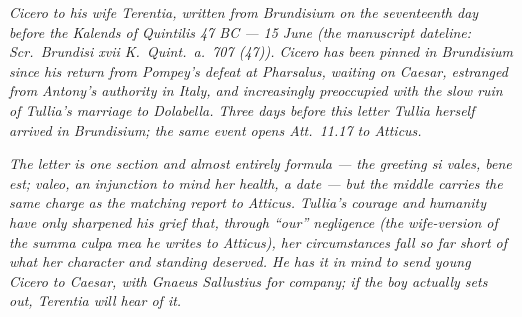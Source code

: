 
\textit{Cicero to his wife Terentia, written from
Brundisium on the seventeenth day before the Kalends
of Quintilis 47 BC --- 15 June (the manuscript
dateline: \textit{Scr.\ Brundisi xvii K.\ Quint.\ a.\
707 (47)}). Cicero has been pinned in Brundisium since
his return from Pompey's defeat at Pharsalus, waiting
on Caesar, estranged from Antony's authority in Italy,
and increasingly preoccupied with the slow ruin of
Tullia's marriage to Dolabella. Three days before this
letter Tullia herself arrived in Brundisium; the same
event opens Att.\ 11.17 to Atticus.}

\textit{The letter is one section and almost entirely
formula --- the greeting \textit{si vales, bene est;
valeo}, an injunction to mind her health, a date --- but
the middle carries the same charge as the matching
report to Atticus. Tullia's courage and humanity have
only sharpened his grief that, through ``our''
negligence (the wife-version of the \textit{summa
culpa mea} he writes to Atticus), her circumstances
fall so far short of what her character and standing
deserved. He has it in mind to send young Cicero to
Caesar, with Gnaeus Sallustius for company; if the
boy actually sets out, Terentia will hear of it.}
